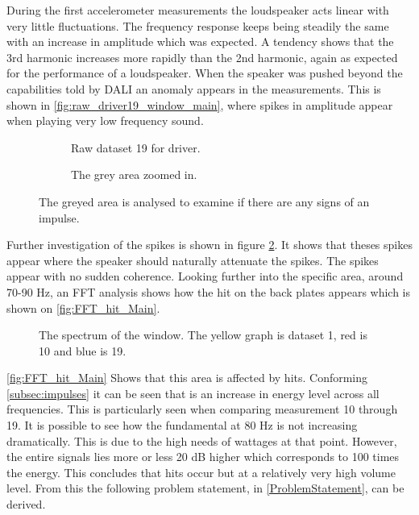 During the first accelerometer measurements the loudspeaker acts linear with very little fluctuations. The frequency response keeps being steadily the same with an increase in amplitude which was expected. A tendency shows that the 3rd harmonic increases more rapidly than the 2nd harmonic, again as expected for the performance of a loudspeaker. When the speaker was pushed beyond the capabilities told by DALI an anomaly appears in the measurements. This is shown in \autoref{fig:raw_driver19_window_main}, where spikes in amplitude appear when playing very low frequency sound. 

\begin{figure}[H]
\centering
\begin{subfigure}[t]{0.55\textwidth}
	
	\caption{Raw dataset 19 for driver.}
	\label{fig:raw_driver19_window_main}
\end{subfigure}
\begin{subfigure}[t]{0.43\textwidth}
	
	\caption{The grey area zoomed in.}
	\label{fig:raw_driver19_window_zoom_main}
\end{subfigure}
\caption{The greyed area is analysed to examine if there are any signs of an impulse.}
\label{fig:raw_driver19_windows_main}
\end{figure}

Further investigation of the spikes is shown in figure \ref{fig:raw_driver19_window_zoom_main}. It shows that theses spikes appear where the speaker should naturally attenuate the spikes. The spikes appear with no sudden coherence. Looking further into the specific area, around 70-90 Hz, an FFT analysis shows how the hit on the back plates appears which is shown on \autoref{fig:FFT_hit_Main}.

\begin{figure}[H]
\centering
{}

\caption{The spectrum of the window. The yellow graph is dataset 1, red is 10 and blue is 19.}
\label{fig:FFT_hit_Main}
\end{figure}

\autoref{fig:FFT_hit_Main} Shows that this area is affected by hits. Conforming \autoref{subsec:impulses} it can be seen that is an increase in energy level across all frequencies. This is particularly seen when comparing measurement 10 through 19. It is possible to see how the fundamental at 80 Hz is not increasing dramatically. This is due to the high needs of wattages at that point. However, the entire signals lies more or less 20 dB higher which corresponds to 100 times the energy. This concludes that hits occur but at a relatively very high volume level. From this the following problem statement, in \autoref{ProblemStatement}, can be derived.





